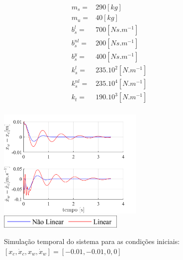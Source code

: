 \documentclass[a4paper]{ifacconf}
\begin{document}
   \begin{equation} \label{eq:parametros}
        \begin{split} 
        m_s =   & 290     [kg]\\
        m_u =   & 40      [kg]\\
        b^{l}_s =  & 700  [Ns.m^{-1}]\\
        b^{nl}_s =  & 200      [Ns.m^{-1}]\\
        b^{y}_s=  & 400      [Ns.m^{-1}]\\
        k^{l}_s =  & 235.10^2 [N.m^{-1}]\\
        k^{nl}_s = & 235.10^4 [N.m^{-1}]\\
        k_t =  & 190.10^3 [N.m^{-1}]\\
        \end{split}
    \end{equation}

    \FloatBarrier
    \begin{figure}[htbp]
        \begin{centering}
            \includegraphics[width=7cm]{img/sim_temp_xc_n001_dxc_n001.png}
            \includegraphics[width=6cm]{img/sim_temp_Leg.png}
            \caption{Simulação temporal do sistema para as condições iniciais:  $[x_c, \dot{x}_c, x_w, \dot{x}_w]=[-0.01,-0.01,0,0]$}
            \label{fig:sim_temp_xc_n001_dxc_n001}
        \end{centering}
    \end{figure}
    \FloatBarrier
    
\end{document}
